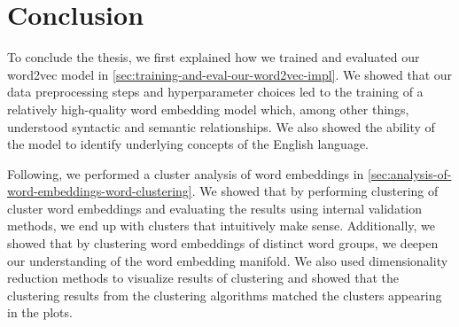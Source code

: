 \section{Conclusion}
\label{sec:conclusion}
To conclude the thesis, we first explained how we trained and evaluated our word2vec model in \cref{sec:training-and-eval-our-word2vec-impl}. We showed that our data preprocessing steps and hyperparameter choices led to the training of a relatively high-quality word embedding model which, among other things, understood syntactic and semantic relationships. We also showed the ability of the model to identify underlying concepts of the English language.

Following, we performed a cluster analysis of word embeddings in \cref{sec:analysis-of-word-embeddings-word-clustering}. We showed that by performing clustering of cluster word embeddings and evaluating the results using internal validation methods, we end up with clusters that intuitively make sense. Additionally, we showed that by clustering word embeddings of distinct word groups, we deepen our understanding of the word embedding manifold. We also used dimensionality reduction methods to visualize results of clustering and showed that the clustering results from the clustering algorithms matched the clusters appearing in the plots.

